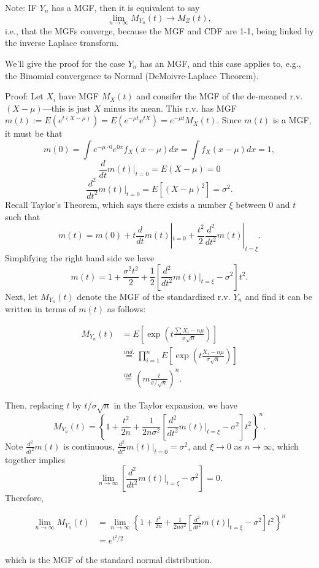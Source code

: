 \documentclass[]{book}
\begin{document}
Note: IF \(Y_n\) has a MGF, then it is equivalent to say
\[\lim_{n\rightarrow \infty}M_{Y_n}(t) \rightarrow M_Z(t),\] i.e., that
the MGFs converge, because the MGF and CDF are 1-1, being linked by the
inverse Laplace transform.

We'll give the proof for the case \(Y_n\) has an MGF, and this case
applies to, e.g., the Binomial convergence to Normal (DeMoivre-Laplace
Theorem).

Proof: Let \(X_i\) have MGF \(M_X(t)\) and consifer the MGF of the
de-meaned r.v. \((X - \mu)\)---this is just \(X\) minus its mean. This
r.v. has MGF
\(m(t):=E(e^{t(X-\mu)}) = E(e^{-\mu t}e^{tX}) = e^{-\mu t}M_X(t)\).
Since \(m(t)\) is a MGF, it must be that
\[m(0) = \int e^{-\mu \cdot 0}e^{0 x}f_X(x-\mu)dx = \int f_X(x-\mu)dx = 1,\]
\[\frac{d}{dt}m(t)|_{t=0} = E(X-\mu) = 0\]
\[\frac{d^2}{dt^2}m(t)|_{t=0} = E[(X-\mu)^2] = \sigma^2.\] Recall
Taylor's Theorem, which says there exists a number \(\xi\) between \(0\)
and \(t\) such that
\[m(t) = m(0) + t \frac{d}{dt}m(t)|_{t=0} + \frac{t^2}{2}\frac{d^2}{dt^2}m(t)|_{t=\xi}.\]
Simplifying the right hand side we have
\[m(t) = 1 + \frac{\sigma^2 t^2}{2} + \frac{1}{2}\left[\frac{d^2}{dt^2}m(t)|_{t=\xi} - \sigma^2\right]t^2.\]
Next, let \(M_{Y_n}(t)\) denote the MGF of the standardized r.v. \(Y_n\)
and find it can be written in terms of \(m(t)\) as follows:

\begin{align*}
M_{Y_n}(t) & = E\left[\exp\left(t\frac{\sum X_i - n\mu}{\sigma \sqrt{n}}\right)\right]\\
& \stackrel{ind.}{=}\prod_{i=1}^n E\left[\exp\left(t\frac{X_i - n\mu}{\sigma \sqrt{n}}\right)\right]\\
& \stackrel{iid.}{=}\left(m\frac{t}{\sigma/\sqrt{n}}\right)^n.
\end{align*}

Then, replacing \(t\) by \(t/\sigma\sqrt n\) in the Taylor expansion, we
have
\[M_{Y_n}(t) = \left\{1 + \frac{t^2}{2n} + \frac{1}{2n\sigma^2}\left[\frac{d^2}{dt^2}m(t)|_{t=\xi} - \sigma^2\right]t^2\right\}^n.\]
Note \(\frac{d^2}{dt^2}m(t)\) is continuous,
\(\frac{d^2}{dt^2}m(t)|_{t=0} = \sigma^2\), and \(\xi \rightarrow 0\) as
\(n\rightarrow \infty\), which together implies
\[\lim_{n\rightarrow \infty}\left[\frac{d^2}{dt^2}m(t)|_{t=\xi} - \sigma^2\right] = 0.\]
Therefore,

\begin{align*}
\lim_{n\rightarrow \infty} M_{Y_n}(t) & = \lim_{n\rightarrow \infty}\left\{1 + \frac{t^2}{2n} + \frac{1}{2n\sigma^2}\left[\frac{d^2}{dt^2}m(t)|_{t=\xi} - \sigma^2\right]t^2\right\}^n \\
& = e^{t^2/2}
\end{align*}

which is the MGF of the standard normal distribution.


\end{document}
